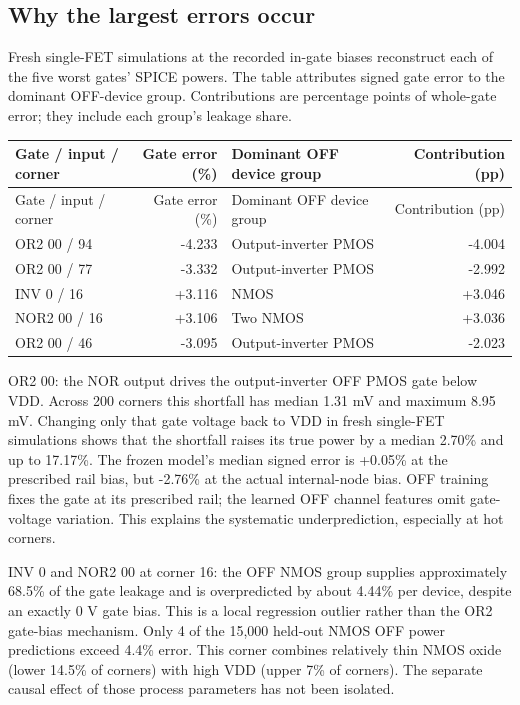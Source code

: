 \subsection*{Why the largest errors occur}
Fresh single-FET simulations at the recorded in-gate biases reconstruct each of the five worst gates' SPICE powers. The table attributes signed gate error to the dominant OFF-device group. Contributions are percentage points of whole-gate error; they include each group's leakage share.

\begingroup
\fontsize{8.5}{11}\selectfont
\setlength{\tabcolsep}{4pt}
\renewcommand{\arraystretch}{1.15}
\begin{longtable}{@{}p{33mm}r p{64mm}r@{}}
\toprule
Gate / input / corner & Gate error (\%) & Dominant OFF device group & Contribution (pp) \\
\midrule
\endfirsthead
\toprule
Gate / input / corner & Gate error (\%) & Dominant OFF device group & Contribution (pp) \\
\midrule
\endhead
\bottomrule
\endlastfoot
OR2 00 / 94 & -4.233 & Output-inverter PMOS & -4.004 \\
OR2 00 / 77 & -3.332 & Output-inverter PMOS & -2.992 \\
INV 0 / 16 & +3.116 & NMOS & +3.046 \\
NOR2 00 / 16 & +3.106 & Two NMOS & +3.036 \\
OR2 00 / 46 & -3.095 & Output-inverter PMOS & -2.023 \\
\end{longtable}
\endgroup

OR2 00: the NOR output drives the output-inverter OFF PMOS gate below VDD. Across 200 corners this shortfall has median 1.31 mV and maximum 8.95 mV. Changing only that gate voltage back to VDD in fresh single-FET simulations shows that the shortfall raises its true power by a median 2.70\% and up to 17.17\%. The frozen model's median signed error is +0.05\% at the prescribed rail bias, but -2.76\% at the actual internal-node bias. OFF training fixes the gate at its prescribed rail; the learned OFF channel features omit gate-voltage variation. This explains the systematic underprediction, especially at hot corners.

INV 0 and NOR2 00 at corner 16: the OFF NMOS group supplies approximately 68.5\% of the gate leakage and is overpredicted by about 4.44\% per device, despite an exactly 0 V gate bias. This is a local regression outlier rather than the OR2 gate-bias mechanism. Only 4 of the 15,000 held-out NMOS OFF power predictions exceed 4.4\% error. This corner combines relatively thin NMOS oxide (lower 14.5\% of corners) with high VDD (upper 7\% of corners). The separate causal effect of those process parameters has not been isolated.

